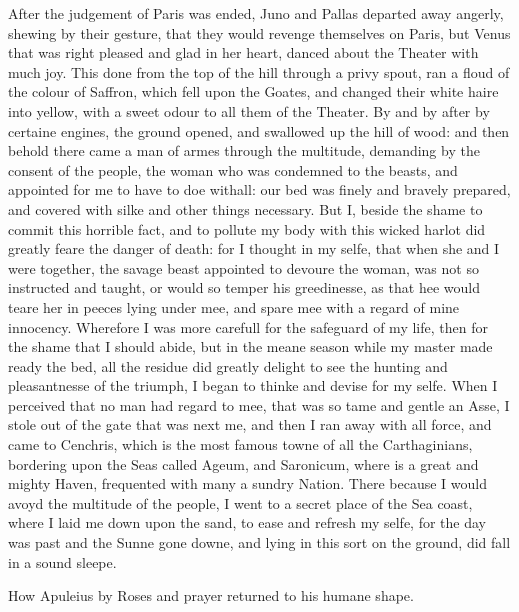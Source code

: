 After the judgement of Paris was ended, Juno and Pallas departed away angerly,
shewing by their gesture, that they would revenge themselves on Paris, but
Venus that was right pleased and glad in her heart, danced about the Theater
with much joy. This done from the top of the hill through a privy spout, ran a
floud of the colour of Saffron, which fell upon the Goates, and changed their
white haire into yellow, with a sweet odour to all them of the Theater. By and
by after by certaine engines, the ground opened, and swallowed up the hill of
wood: and then behold there came a man of armes through the multitude,
demanding by the consent of the people, the woman who was condemned to the
beasts, and appointed for me to have to doe withall: our bed was finely and
bravely prepared, and covered with silke and other things necessary. But I,
beside the shame to commit this horrible fact, and to pollute my body with this
wicked harlot did greatly feare the danger of death: for I thought in my selfe,
that when she and I were together, the savage beast appointed to devoure the
woman, was not so instructed and taught, or would so temper his greedinesse, as
that hee would teare her in peeces lying under mee, and spare mee with a regard
of mine innocency. Wherefore I was more carefull for the safeguard of my life,
then for the shame that I should abide, but in the meane season while my master
made ready the bed, all the residue did greatly delight to see the hunting and
pleasantnesse of the triumph, I began to thinke and devise for my selfe. When I
perceived that no man had regard to mee, that was so tame and gentle an Asse, I
stole out of the gate that was next me, and then I ran away with all force, and
came to Cenchris, which is the most famous towne of all the Carthaginians,
bordering upon the Seas called Ageum, and Saronicum, where is a great and
mighty Haven, frequented with many a sundry Nation. There because I would avoyd
the multitude of the people, I went to a secret place of the Sea coast, where I
laid me down upon the sand, to ease and refresh my selfe, for the day was past
and the Sunne gone downe, and lying in this sort on the ground, did fall in a
sound sleepe.



How Apuleius by Roses and prayer returned to his humane shape.

